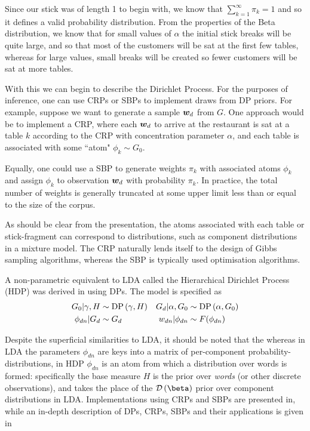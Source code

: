 Since our stick was of length 1 to begin with, we know that $\sum_{k=1}^{\infty} \pi_k = 1$ and so it defines a valid probability distribution. From the properties of the Beta distribution, we know that for small values of $\alpha$ the initial stick breaks will be quite large, and so that most of the customers will be sat at the first few tables, whereas for large values, small breaks will be created so fewer customers will be sat at more tables.

With this we can begin to describe the Dirichlet Process. For the purposes of inference, one can use CRPs or SBPs to implement draws from DP priors. For example, suppose we want to generate a sample ${ \bm w_d }$ from $G$. One approach would be to implement a CRP\cite{Neal2000}, where each ${ \bm w_d }$ to arrive at the restaurant is sat at a table $k$ according to the CRP with concentration parameter $\alpha$, and each table is associated with some ``atom" $\phi_k \sim G_0$.

Equally, one could use a SBP\cite{Sethuraman1994} to generate weights $\pi_k$ with associated atoms $\phi_k$ and assign $\phi_k$ to observation ${ \bm w_d }$ with probability $\pi_k$. In practice, the total number of weights is generally truncated at some upper limit less than or equal to the size of the corpus. 

As should be clear from the presentation, the atoms associated with each table or stick-fragment can correspond to distributions, such as component distributions in a mixture model. The CRP naturally lends itself to the design of Gibbs sampling algorithms, whereas the SBP is typically used optimisation algorithms. 

A non-parametric equivalent to LDA called the Hierarchical Dirichlet Process (HDP) was derived in \cite{Teh2006b} using DPs. The model is specified as
\begin{align}
G_0 | \gamma, H & \sim \text{DP} \left( {\gamma, H } \right) &
G_d | \alpha, G_0 & \sim \text{DP} \left( {\alpha, G_0} \right) \\
\phi_{dn} |G_d &\sim G_d & w_{dn} | \phi_{dn} & \sim F(\phi_{dn})
\end{align}

Despite the superficial similarities to LDA, it should be noted that the whereas in LDA the parameters $\phi_{dn}$ are keys into a matrix of per-component probability-distributions, in HDP $\phi_{dn}$ is an atom from which a distribution over words is formed: specifically the base measure $H$ is the prior over \emph{words} (or other discrete observations), and takes the place of the $\dir{\vv{\beta}}$ prior over component distributions in LDA. Implementations using CRPs and SBPs are presented in\cite{Teh2006b}, while an in-depth description of DPs, CRPs, SBPs and their applications is given in\cite{JordanMichael2005a}

